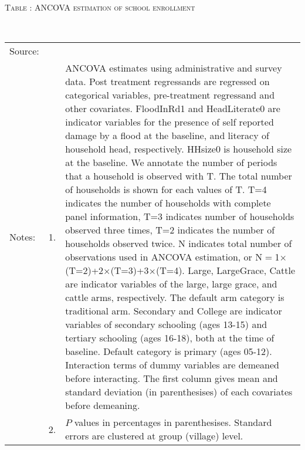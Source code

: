 \hspace{-1cm}\begin{minipage}[t]{14cm}
\hfil\textsc{\normalsize Table \thetable: ANCOVA estimation of school enrollment\label{tab ANCOVA enroll}}\\
\setlength{\tabcolsep}{1pt}
\setlength{\baselineskip}{8pt}
\renewcommand{\arraystretch}{.525}
\hfil{}\\
\renewcommand{\arraystretch}{.7}
\setlength{\tabcolsep}{1pt}
\hspace{-1cm}\begin{tabular}{>{\hfill\scriptsize}p{1cm}<{}>{\hfill\scriptsize}p{.25cm}<{}>{\scriptsize}p{15cm}<{\hfill}}
Source:& \multicolumn{2}{l}{\scriptsize Estimated with GUK administrative and survey data.}\\
Notes: & 1. & ANCOVA estimates using administrative and survey data. Post treatment regressands are regressed on categorical variables, pre-treatment regressand and other covariates. \textsf{FloodInRd1} and \textsf{HeadLiterate0} are indicator variables for the presence of self reported damage by a flood at the baseline, and literacy of household head, respectively. \textsf{HHsize0} is household size at the baseline. We annotate the number of periods that a household is observed with \textsf{T}. The total number of households is shown for each values of \textsf{T}. \textsf{T=4} indicates the number of households with complete panel information, \textsf{T=3} indicates number of households observed three times, \textsf{T=2} indicates the number of households observed twice. \textsf{N} indicates total number of observations used in ANCOVA estimation, or \textsf{N$=$1$\times$(T=2)+2$\times$(T=3)+3$\times$(T=4)}.  \textsf{Large}, \textsf{LargeGrace}, \textsf{Cattle} are indicator variables of the \textsf{large}, \textsf{large grace}, and \textsf{cattle} arms, respectively. The default arm category is \textsf{traditional} arm. \textsf{Secondary} and \textsf{College} are indicator variables of secondary schooling (ages 13-15) and tertiary schooling (ages 16-18), both at the time of baseline. Default category is primary (ages 05-12). Interaction terms of dummy variables are demeaned before interacting. The first column gives mean and standard deviation (in parenthesises) of each covariates before demeaning.\\
& 2. & $P$ values in percentages in parenthesises. Standard errors are clustered at group (village) level.%
\end{tabular}
\end{minipage}

